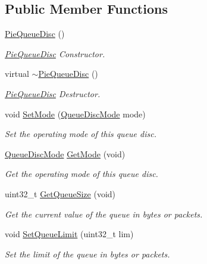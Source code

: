 \subsection*{Public Member Functions}
\begin{DoxyCompactItemize}
\item 
\hyperlink{classns3_1_1PieQueueDisc_ad960f4cf2fd0d2c6e25e05c4cbb12ef8}{Pie\+Queue\+Disc} ()
\begin{DoxyCompactList}\small\item\em \hyperlink{classns3_1_1PieQueueDisc}{Pie\+Queue\+Disc} Constructor. \end{DoxyCompactList}\item 
virtual \hyperlink{classns3_1_1PieQueueDisc_a48e824b25076eb44cd2fce6e7b1d5461}{$\sim$\+Pie\+Queue\+Disc} ()
\begin{DoxyCompactList}\small\item\em \hyperlink{classns3_1_1PieQueueDisc}{Pie\+Queue\+Disc} Destructor. \end{DoxyCompactList}\item 
void \hyperlink{classns3_1_1PieQueueDisc_acdd70eff41af17390496084a87627045}{Set\+Mode} (\hyperlink{classns3_1_1PieQueueDisc_af026730ff1c04dd9bdf74b1797ae2ac4}{Queue\+Disc\+Mode} mode)
\begin{DoxyCompactList}\small\item\em Set the operating mode of this queue disc. \end{DoxyCompactList}\item 
\hyperlink{classns3_1_1PieQueueDisc_af026730ff1c04dd9bdf74b1797ae2ac4}{Queue\+Disc\+Mode} \hyperlink{classns3_1_1PieQueueDisc_a13bb54f830216e6d8e114abe3b4b04be}{Get\+Mode} (void)
\begin{DoxyCompactList}\small\item\em Get the operating mode of this queue disc. \end{DoxyCompactList}\item 
uint32\+\_\+t \hyperlink{classns3_1_1PieQueueDisc_ae8675ca8d1c18d43ca678f30040e8510}{Get\+Queue\+Size} (void)
\begin{DoxyCompactList}\small\item\em Get the current value of the queue in bytes or packets. \end{DoxyCompactList}\item 
void \hyperlink{classns3_1_1PieQueueDisc_a2a3d97fd3ad7ea6f486e090c1f772476}{Set\+Queue\+Limit} (uint32\+\_\+t lim)
\begin{DoxyCompactList}\small\item\em Set the limit of the queue in bytes or packets. \end{DoxyCompactList}\item 

\end{DoxyCompactItemize}
